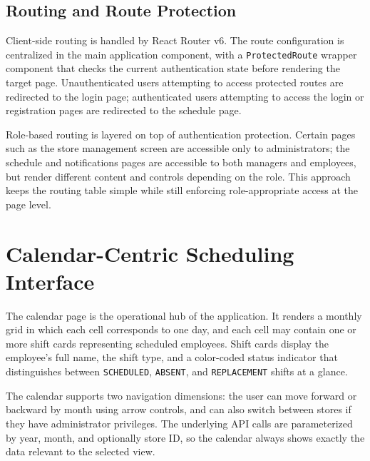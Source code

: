 \subsection{Routing and Route Protection}
\par Client-side routing is handled by React Router v6. The route configuration is centralized in the main application component, with a \texttt{ProtectedRoute} wrapper component that checks the current authentication state before rendering the target page. Unauthenticated users attempting to access protected routes are redirected to the login page; authenticated users attempting to access the login or registration pages are redirected to the schedule page.

\par Role-based routing is layered on top of authentication protection. Certain pages such as the store management screen are accessible only to administrators; the schedule and notifications pages are accessible to both managers and employees, but render different content and controls depending on the role. This approach keeps the routing table simple while still enforcing role-appropriate access at the page level.

\section{Calendar-Centric Scheduling Interface}
\par The calendar page is the operational hub of the application. It renders a monthly grid in which each cell corresponds to one day, and each cell may contain one or more shift cards representing scheduled employees. Shift cards display the employee's full name, the shift type, and a color-coded status indicator that distinguishes between \texttt{SCHEDULED}, \texttt{ABSENT}, and \texttt{REPLACEMENT} shifts at a glance.

\par The calendar supports two navigation dimensions: the user can move forward or backward by month using arrow controls, and can also switch between stores if they have administrator privileges. The underlying API calls are parameterized by year, month, and optionally store ID, so the calendar always shows exactly the data relevant to the selected view.

